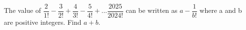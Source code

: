 The value of $\dfrac{2}{1!} - \dfrac{3}{2!} + \dfrac{4}{3!} - \dfrac{5}{4!} + ... \dfrac{2025}{2024!}$ can be written as $a- \dfrac{1}{b!}$ where a and b are positive integers. Find $a + b$.
